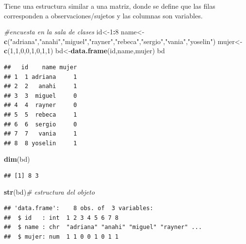 \documentclass[
]{book}
\newenvironment{Shaded}{\begin{snugshade}}{\end{snugshade}}
\newcommand{\CommentTok}[1]{\textcolor[rgb]{0.56,0.35,0.01}{\textit{#1}}}
\newcommand{\DecValTok}[1]{\textcolor[rgb]{0.00,0.00,0.81}{#1}}
\newcommand{\KeywordTok}[1]{\textcolor[rgb]{0.13,0.29,0.53}{\textbf{#1}}}
\newcommand{\NormalTok}[1]{#1}
\newcommand{\OperatorTok}[1]{\textcolor[rgb]{0.81,0.36,0.00}{\textbf{#1}}}
\newcommand{\StringTok}[1]{\textcolor[rgb]{0.31,0.60,0.02}{#1}}
\begin{document}
Tiene una estructura similar a una matriz, donde se define que las filas corresponden a observaciones/sujetos y las columnas son variables.

\begin{Shaded}
\begin{Highlighting}[]
\CommentTok{#encuesta en la sala de clases}
\NormalTok{id<-}\DecValTok{1}\OperatorTok{:}\DecValTok{8}
\NormalTok{name<-}\KeywordTok{c}\NormalTok{(}\StringTok{"adriana"}\NormalTok{,}\StringTok{"anahi"}\NormalTok{,}\StringTok{"miguel"}\NormalTok{,}\StringTok{"rayner"}\NormalTok{,}\StringTok{"rebeca"}\NormalTok{,}\StringTok{"sergio"}\NormalTok{,}\StringTok{"vania"}\NormalTok{,}\StringTok{"yoselin"}\NormalTok{)}
\NormalTok{mujer<-}\KeywordTok{c}\NormalTok{(}\DecValTok{1}\NormalTok{,}\DecValTok{1}\NormalTok{,}\DecValTok{0}\NormalTok{,}\DecValTok{0}\NormalTok{,}\DecValTok{1}\NormalTok{,}\DecValTok{0}\NormalTok{,}\DecValTok{1}\NormalTok{,}\DecValTok{1}\NormalTok{)}
\NormalTok{bd<-}\KeywordTok{data.frame}\NormalTok{(id,name,mujer)}
\NormalTok{bd}
\end{Highlighting}
\end{Shaded}

\begin{verbatim}
##   id    name mujer
## 1  1 adriana     1
## 2  2   anahi     1
## 3  3  miguel     0
## 4  4  rayner     0
## 5  5  rebeca     1
## 6  6  sergio     0
## 7  7   vania     1
## 8  8 yoselin     1
\end{verbatim}

\begin{Shaded}
\begin{Highlighting}[]
\KeywordTok{dim}\NormalTok{(bd)}
\end{Highlighting}
\end{Shaded}

\begin{verbatim}
## [1] 8 3
\end{verbatim}

\begin{Shaded}
\begin{Highlighting}[]
\KeywordTok{str}\NormalTok{(bd)}\CommentTok{# estructura del objeto}
\end{Highlighting}
\end{Shaded}

\begin{verbatim}
## 'data.frame':    8 obs. of  3 variables:
##  $ id   : int  1 2 3 4 5 6 7 8
##  $ name : chr  "adriana" "anahi" "miguel" "rayner" ...
##  $ mujer: num  1 1 0 0 1 0 1 1
\end{verbatim}
\end{document}
